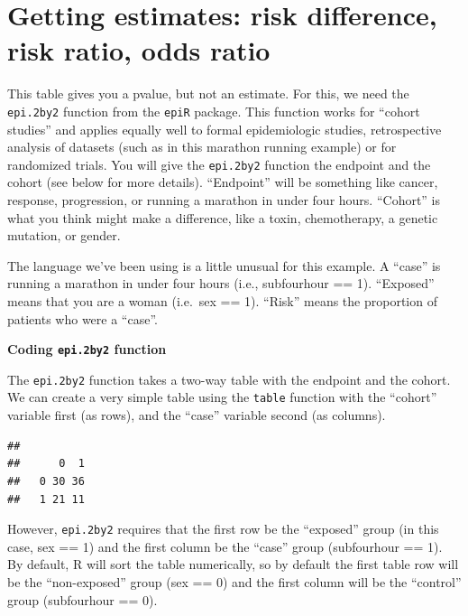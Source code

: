 \documentclass[]{book}
\newenvironment{Shaded}{\begin{snugshade}}{\end{snugshade}}
\newcommand{\KeywordTok}[1]{\textcolor[rgb]{0.13,0.29,0.53}{\textbf{#1}}}
\newcommand{\NormalTok}[1]{#1}
\newcommand{\OperatorTok}[1]{\textcolor[rgb]{0.81,0.36,0.00}{\textbf{#1}}}
\begin{document}
\hypertarget{getting-estimates-risk-difference-risk-ratio-odds-ratio}{%
\section{Getting estimates: risk difference, risk ratio, odds
ratio}\label{getting-estimates-risk-difference-risk-ratio-odds-ratio}}

This table gives you a pvalue, but not an estimate. For this, we need
the \texttt{epi.2by2} function from the \texttt{epiR} package. This
function works for ``cohort studies'' and applies equally well to formal
epidemiologic studies, retrospective analysis of datasets (such as in
this marathon running example) or for randomized trials. You will give
the \texttt{epi.2by2} function the endpoint and the cohort (see below
for more details). ``Endpoint'' will be something like cancer, response,
progression, or running a marathon in under four hours. ``Cohort'' is
what you think might make a difference, like a toxin, chemotherapy, a
genetic mutation, or gender.

The language we've been using is a little unusual for this example. A
``case'' is running a marathon in under four hours (i.e., subfourhour ==
1). ``Exposed'' means that you are a woman (i.e.~sex == 1). ``Risk''
means the proportion of patients who were a ``case''.

\textbf{Coding \texttt{epi.2by2} function}

The \texttt{epi.2by2} function takes a two-way table with the endpoint
and the cohort. We can create a very simple table using the
\texttt{table} function with the ``cohort'' variable first (as rows),
and the ``case'' variable second (as columns).

\begin{Shaded}
\end{Shaded}

\begin{verbatim}
##    
##      0  1
##   0 30 36
##   1 21 11
\end{verbatim}

However, \texttt{epi.2by2} requires that the first row be the
``exposed'' group (in this case, sex == 1) and the first column be the
``case'' group (subfourhour == 1). By default, R will sort the table
numerically, so by default the first table row will be the
``non-exposed'' group (sex == 0) and the first column will be the
``control'' group (subfourhour == 0).
\end{document}
